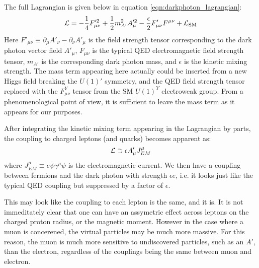 The full Lagrangian is given below in equation \ref{eqn:darkphoton_lagrangian}:
\begin{equation}
\label{eqn:darkphoton_lagrangian}
\operatorname{\mathcal{L}} = -\frac{1}{4}F'^2_{\mu\nu} + \frac{1}{2}m_{A'}^2 A'^2_\mu - \frac{\epsilon}{2}F'_{\mu\nu} F^{\mu\nu} + \operatorname{\mathcal{L}}_{\textrm{SM}}
\end{equation}
Here $F'_{\mu\nu} \equiv \partial_\mu A'_\nu - \partial_\nu A'_\mu$ is the field strength tensor corresponding to the dark photon vector field $A'_\mu$, $F_{\mu\nu}$ is the typical QED electromagnetic field strength tensor, $m_{A'}$ is the corresponding dark photon mass, and $\epsilon$ is the kinetic mixing strength.
The mass term appearing here actually could be inserted from a new Higgs field breaking the $U(1)'$ symmetry, and the QED field strength tensor replaced with the $F^Y_{\mu\nu}$ tensor from the SM $U(1)^Y$ electroweak group.
From a phenomenological point of view, it is sufficient to leave the mass term as it appears for our purposes.

After integrating the kinetic mixing term appearing in the Lagrangian by parts, the coupling to charged leptons (and quarks) becomes apparent as:
\begin{equation}
    \label{eqn:darkphoton_qed_current}
    \operatorname{\mathcal{L}} \supset \epsilon A'_\mu J^\mu_{EM}
\end{equation}
where $J^\mu_{EM} \equiv e \overbar{\psi} \gamma^\mu \psi$ is the electromagnetic current.
We then have a coupling between fermions and the dark photon with strength $\epsilon e$, i.e. it looks just like the typical QED coupling but suppressed by a factor of $\epsilon$.

This may look like the coupling to each lepton is the same, and it is.
It is not immeditately clear that one can have an assymetric effect across leptons on the charged proton radius, or the magnetic moment.
However in the case where a muon is concerened, the virtual particles may be much more massive.
For this reason, the muon is much more sensitive to undiscovered particles, such as an $A'$, than the electron, regardless of the couplings being the same between muon and electron.
